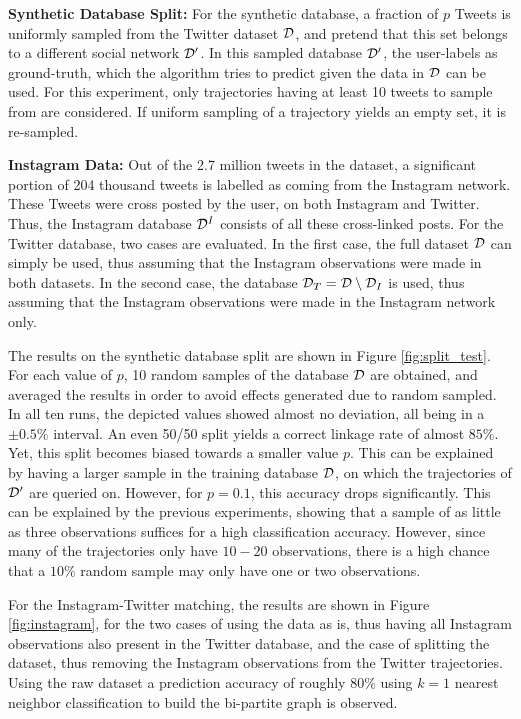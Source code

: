 {\bf Synthetic Database Split:} For the synthetic database, a fraction of $p$ Tweets is uniformly sampled from the Twitter dataset $\mathcal{D}$, and pretend that this set belongs to a different social network $\mathcal{D}^\prime$. In this sampled database $\mathcal{D}^\prime$, the user-labels as ground-truth, which the algorithm tries to predict given the data in $\mathcal{D}$ can be used. For this experiment, only trajectories having at least 10 tweets to sample from are considered. If uniform sampling of a trajectory yields an empty set, it is re-sampled.

{\bf Instagram Data:} Out of the 2.7 million tweets in the dataset, a significant portion of 204 thousand tweets is labelled as coming from the Instagram network. These Tweets were cross posted by the user, on both Instagram and Twitter. Thus, the Instagram database $\mathcal{D}^I$ consists of all these cross-linked posts. For the Twitter database, two cases are evaluated. In the first case, the full dataset $\mathcal{D}$ can simply be used, thus assuming that the Instagram observations were made in both datasets. In the second case, the database $\mathcal{D}_T=\mathcal{D}\setminus \mathcal{D}_I$ is used, thus assuming that the Instagram observations were made in the Instagram network only.

The results on the synthetic database split are shown in Figure \ref{fig:split_test}.
For each value of $p$, 10 random samples of the database $\mathcal{D}$ are obtained, and averaged the results in order to avoid effects generated due to random sampled. In all ten runs, the depicted values showed almost no deviation, all being in a $\pm 0.5\%$ interval. An even 50/50 split yields a correct linkage rate of almost $85\%$. Yet, this split becomes biased towards a smaller value $p$. This can be explained by having a larger sample in the training database $\mathcal{D}$, on which the trajectories of $\mathcal{D}^\prime$ are queried on. However, for $p=0.1$, this accuracy drops significantly. This can be explained by the previous experiments, showing that a sample of as little as three observations suffices for a high classification accuracy. However, since many of the trajectories only have $10-20$ observations, there is a high chance that a $10\%$ random sample may only have one or two observations.

For the Instagram-Twitter matching, the results are shown in Figure \ref{fig:instagram}, for the two cases of using the data as is, thus having all Instagram observations also present in the Twitter database, and the case of splitting the dataset, thus removing the Instagram observations from the Twitter trajectories. Using the raw dataset a prediction accuracy of roughly $80\%$ using $k=1$ nearest neighbor classification to build the bi-partite graph is observed.

